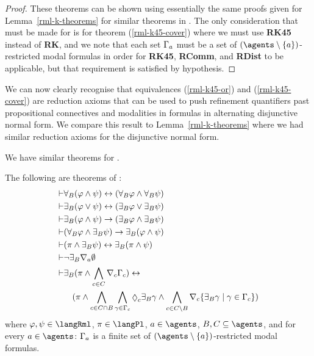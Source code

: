 \begin{proof}
These theorems can be shown using essentially the same proofs given for Lemma~\ref{rml-k-theorems} for similar theorems in \axiomRmlK{}.
The only consideration that must be made for \axiomRmlKFF{} is for theorem (\ref{rml-k45-cover}) where we must use {\bf RK45} instead of {\bf RK}, and we note that each set $\Gamma_a$ must be a set of $(\agents \setminus \{\agentA\})$-restricted modal formulas in order for {\bf RK45}, {\bf RComm}, and {\bf RDist} to be applicable, but that requirement is satisfied by hypothesis.
\end{proof}

We can now clearly recognise that equivalences (\ref{rml-k45-or}) and (\ref{rml-k45-cover}) are reduction axioms that can be used to push refinement quantifiers past propositional connectives and modalities in formulas in alternating disjunctive normal form.
We compare this result to Lemma~\ref{rml-k-theorems} where we had similar reduction axioms for the disjunctive normal form.

We have similar theorems for \axiomRmlKD{}.

\begin{lemma}\label{rml-kd45-theorems}
The following are theorems of \axiomRmlKD{}:
\begin{align}
    \proves & \allrefsBs (\phi \land \psi) \iff (\allrefsBs \phi \land \allrefsBs \psi) \label{rml-kd45-and}\\
    \proves & \somerefsBs (\phi \lor \psi) \iff (\somerefsBs \phi \lor \somerefsBs \psi) \label{rml-kd45-or}\\
    \proves & \somerefsBs (\phi \land \psi) \implies (\somerefsBs \phi \land \somerefsBs \psi) \label{rml-kd45-d-and}\\
    \proves & (\allrefsBs \phi \land \somerefsBs \psi) \implies \somerefsBs (\phi \land \psi) \label{rml-kd45-db-and}\\
    \proves & (\pi \land \somerefsBs \psi) \iff \somerefsBs (\pi \land \psi) \label{rml-kd45-pd-and}\\
    \proves & \lnot \somerefsBs \coversA \emptyset \label{rml-kd45-cover-empty}\\
    \proves & \displaystyle \somerefsBs (\pi \land \bigwedge_{\agentC \in \agentsC} \coverC \Gamma_\agentC) \iff \nonumber\\
            & \displaystyle \quad
            (
            \pi \land
            \bigwedge_{\agentC \in \agentsC \cap \agentsB} \bigwedge_{\gamma \in \Gamma_\agentC} \possibleC \somerefsBs \gamma \land
            \bigwedge_{\agentC \in \agentsC \setminus \agentsB} \coversC \{\somerefsBs \gamma \mid \gamma \in \Gamma_\agentC\} 
            ) \label{rml-kd45-cover}
\end{align}
where $\phi, \psi \in \langRml$, $\pi \in \langPl$, $\agentA \in \agents$, $\agentsB, \agentsC \subseteq \agents$, and for every $\agentA \in \agents$: $\Gamma_a$ is a finite set of $(\agents \setminus \{\agentA\})$-restricted modal formulas.
\end{lemma}

